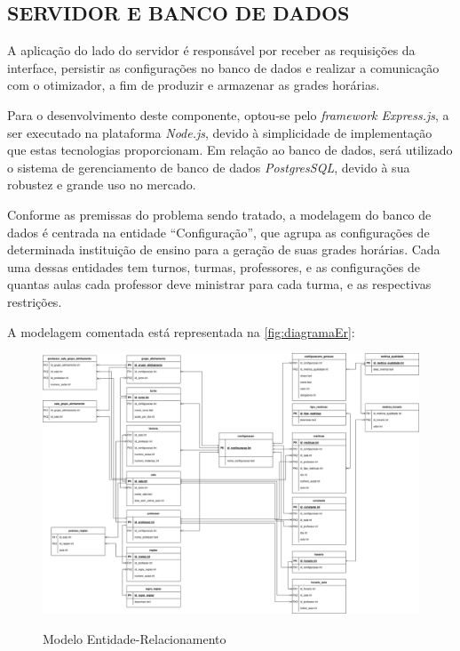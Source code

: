 \subsection{SERVIDOR E BANCO DE DADOS}

A aplicação do lado do servidor é responsável por receber as requisições da interface, persistir as configurações no banco de dados e realizar a comunicação com o otimizador, a fim de produzir e armazenar as grades horárias.

Para o desenvolvimento deste componente, optou-se pelo \textit{framework Express.js}, a ser executado na plataforma \textit{Node.js}, devido à simplicidade de implementação que estas tecnologias proporcionam. Em relação ao banco de dados, será utilizado o sistema de gerenciamento de banco de dados \textit{PostgresSQL}, devido à sua robustez e grande uso no mercado.

Conforme as premissas do problema sendo tratado, a modelagem do banco de dados é centrada na entidade ``Configuração'', que agrupa as configurações de determinada instituição de ensino para a geração de suas grades horárias. Cada uma dessas entidades tem turnos, turmas, professores, e as configurações de quantas aulas cada professor deve ministrar para cada turma, e as respectivas restrições.

A modelagem comentada está representada na \autoref{fig:diagramaEr}:

\begin{figure}[!htb]
	\centering
	\caption{Modelo Entidade-Relacionamento}
	\includegraphics[width=1\textwidth]{./dados/figuras/ER_horario_INCREMENTO3}
	\label{fig:diagramaEr}
\end{figure}
\newpage


